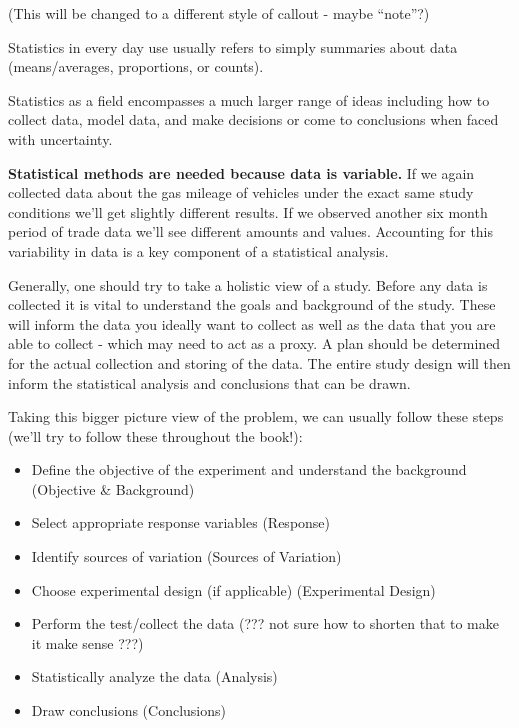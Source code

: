 \documentclass[]{book}
\providecommand{\tightlist}{%
  \setlength{\itemsep}{0pt}\setlength{\parskip}{0pt}}
\theoremstyle{definition}
\theoremstyle{definition}
\theoremstyle{definition}
\theoremstyle{remark}
\let\BeginKnitrBlock\begin \let\EndKnitrBlock\end
\begin{document}
\BeginKnitrBlock{definition}
(This will be changed to a different style of callout - maybe ``note''?)

Statistics in every day use usually refers to simply summaries about
data (means/averages, proportions, or counts).

Statistics as a field encompasses a much larger range of ideas including
how to collect data, model data, and make decisions or come to
conclusions when faced with uncertainty.
\EndKnitrBlock{definition}

\textbf{Statistical methods are needed because data is variable.} If we
again collected data about the gas mileage of vehicles under the exact
same study conditions we'll get slightly different results. If we
observed another six month period of trade data we'll see different
amounts and values. Accounting for this variability in data is a key
component of a statistical analysis.

Generally, one should try to take a holistic view of a study. Before any
data is collected it is vital to understand the goals and background of
the study. These will inform the data you ideally want to collect as
well as the data that you are able to collect - which may need to act as
a proxy. A plan should be determined for the actual collection and
storing of the data. The entire study design will then inform the
statistical analysis and conclusions that can be drawn.

Taking this bigger picture view of the problem, we can usually follow
these steps (we'll try to follow these throughout the book!):

\begin{itemize}
\tightlist
\item
  Define the objective of the experiment and understand the background
  (Objective \& Background)\\
\item
  Select appropriate response variables (Response)\\
\item
  Identify sources of variation (Sources of Variation)\\
\item
  Choose experimental design (if applicable) (Experimental Design)\\
\item
  Perform the test/collect the data (??? not sure how to shorten that to
  make it make sense ???)
\item
  Statistically analyze the data (Analysis)\\
\item
  Draw conclusions (Conclusions)
\end{itemize}
\end{document}
